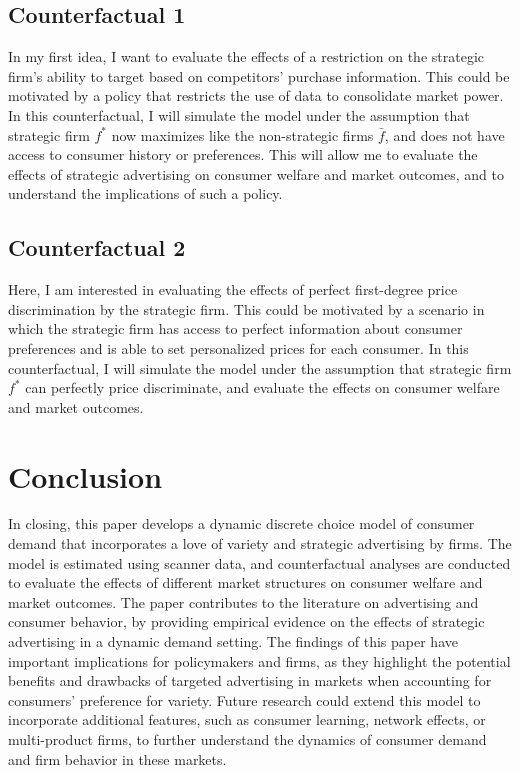 \documentclass[12pt]{article}
\begin{document}
    \subsection{Counterfactual 1}

    In my first idea, I want to evaluate the effects of a restriction on the strategic firm's ability to target based on competitors' purchase information. This could be motivated by a policy that restricts the use of data to consolidate market power. In this counterfactual, I will simulate the model under the assumption that strategic firm $f^*$ now maximizes like the non-strategic firms $\bar{f}$, and does not have access to consumer history or preferences. This will allow me to evaluate the effects of strategic advertising on consumer welfare and market outcomes, and to understand the implications of such a policy.

    \subsection{Counterfactual 2}

    Here, I am interested in evaluating the effects of perfect first-degree price discrimination by the strategic firm. This could be motivated by a scenario in which the strategic firm has access to perfect information about consumer preferences and is able to set personalized prices for each consumer. In this counterfactual, I will simulate the model under the assumption that strategic firm $f^*$ can perfectly price discriminate, and evaluate the effects on consumer welfare and market outcomes.

\section{Conclusion}

In closing, this paper develops a dynamic discrete choice model of consumer demand that incorporates a love of variety and strategic advertising by firms. The model is estimated using scanner data, and counterfactual analyses are conducted to evaluate the effects of different market structures on consumer welfare and market outcomes. The paper contributes to the literature on  advertising and consumer behavior, by providing empirical evidence on the effects of strategic advertising in a dynamic demand setting. The findings of this paper have important implications for policymakers and firms, as they highlight the potential benefits and drawbacks of targeted advertising in markets when accounting for consumers' preference for variety. Future research could extend this model to incorporate additional features, such as consumer learning, network effects, or multi-product firms, to further understand the dynamics of consumer demand and firm behavior in these markets.
\end{document}
